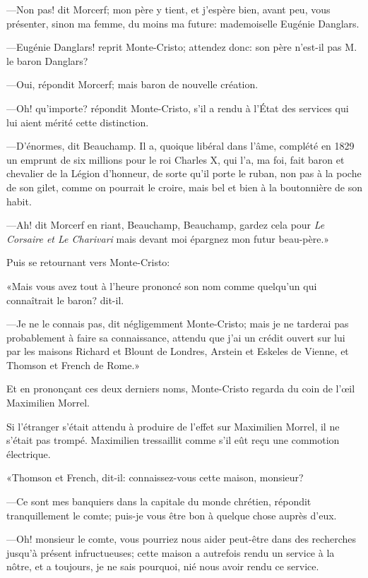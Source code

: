 —Non pas! dit Morcerf; mon père y tient, et j'espère bien, avant peu, vous présenter, sinon ma femme, du moins ma future: mademoiselle Eugénie Danglars. 

—Eugénie Danglars! reprit Monte-Cristo; attendez donc: son père n'est-il pas M. le baron Danglars? 

—Oui, répondit Morcerf; mais baron de nouvelle création.  

—Oh! qu'importe? répondit Monte-Cristo, s'il a rendu à l'État des services qui lui aient mérité cette distinction. 

—D'énormes, dit Beauchamp. Il a, quoique libéral dans l'âme, complété en 1829 un emprunt de six millions pour le roi Charles X, qui l'a, ma foi, fait baron et chevalier de la Légion d'honneur, de sorte qu'il porte le ruban, non pas à la poche de son gilet, comme on pourrait le croire, mais bel et bien à la boutonnière de son habit. 

—Ah! dit Morcerf en riant, Beauchamp, Beauchamp, gardez cela pour \textit{Le Corsaire et Le Charivari} mais devant moi épargnez mon futur beau-père.» 

Puis se retournant vers Monte-Cristo: 

«Mais vous avez tout à l'heure prononcé son nom comme quelqu'un qui connaîtrait le baron? dit-il. 

—Je ne le connais pas, dit négligemment Monte-Cristo; mais je ne tarderai pas probablement à faire sa connaissance, attendu que j'ai un crédit ouvert sur lui par les maisons Richard et Blount de Londres, Arstein et Eskeles de Vienne, et Thomson et French de Rome.» 

Et en prononçant ces deux derniers noms, Monte-Cristo regarda du coin de l'œil Maximilien Morrel. 

Si l'étranger s'était attendu à produire de l'effet sur Maximilien Morrel, il ne s'était pas trompé. Maximilien tressaillit comme s'il eût reçu une commotion électrique. 

«Thomson et French, dit-il: connaissez-vous cette maison, monsieur? 

—Ce sont mes banquiers dans la capitale du monde chrétien, répondit tranquillement le comte; puis-je vous être bon à quelque chose auprès d'eux. 

—Oh! monsieur le comte, vous pourriez nous aider peut-être dans des recherches jusqu'à présent infructueuses; cette maison a autrefois rendu un service à la nôtre, et a toujours, je ne sais pourquoi, nié nous avoir rendu ce service.  

